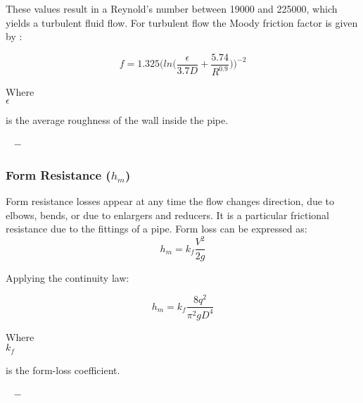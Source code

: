 These values result in a Reynold's number between 19000 and 225000, which yields a turbulent fluid flow. For turbulent flow the 
Moody friction factor is given by \cite{Design_Water} : 

\begin{equation}
  f = 1.325 \bigg(ln\bigg(\frac{\epsilon}{3.7 D}+\frac{5.74}{R^{0.9}}\bigg)\bigg)^{-2}
  \label{turbulent}
\end{equation}

\begin{minipage}[t]{0.20\textwidth}
Where\\
\hspace*{8mm} $\epsilon$ 
\end{minipage}
\begin{minipage}[t]{0.68\textwidth}
\vspace*{2mm}
is the average roughness of the wall inside the pipe.
 \end{minipage}
\begin{minipage}[t]{0.10\textwidth}
\vspace*{2mm}
\textcolor{White}{te}$\unit{-}$
\end{minipage}

%
\subsubsection{Form Resistance ($h_m$)} 
Form resistance losses appear at any time the flow changes direction, due to elbows, bends,
or due to enlargers and reducers. It is a particular frictional resistance due to the 
fittings of a pipe. Form loss can be expressed as:
\begin{equation}
  h_m = k_f \frac{V^2}{2g}
\end{equation}


Applying the continuity law:

\begin{equation}
   h_m = k_f \frac{8q^2}{\pi^2gD^4}
\label{Formloss}
\end{equation}

 \begin{minipage}[t]{0.20\textwidth}
Where\\
\hspace*{8mm} $k_f$ 
\end{minipage}
\begin{minipage}[t]{0.68\textwidth}
\vspace*{2mm}
is the form-loss coefficient.  
 \end{minipage}
\begin{minipage}[t]{0.10\textwidth}
\vspace*{2mm}
\textcolor{White}{te}$\unit{-}$
\end{minipage}

